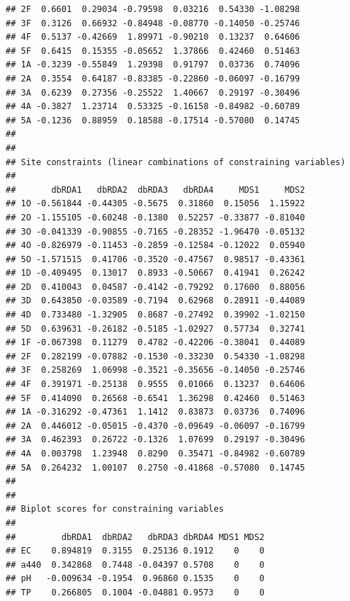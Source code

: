 \documentclass[
]{book}
\begin{document}
\begin{verbatim}
## 2F  0.6601  0.29034 -0.79598  0.03216  0.54330 -1.08298
## 3F  0.3126  0.66932 -0.84948 -0.08770 -0.14050 -0.25746
## 4F  0.5137 -0.42669  1.89971 -0.90210  0.13237  0.64606
## 5F  0.6415  0.15355 -0.05652  1.37866  0.42460  0.51463
## 1A -0.3239 -0.55849  1.29398  0.91797  0.03736  0.74096
## 2A  0.3554  0.64187 -0.83385 -0.22860 -0.06097 -0.16799
## 3A  0.6239  0.27356 -0.25522  1.40667  0.29197 -0.30496
## 4A -0.3827  1.23714  0.53325 -0.16158 -0.84982 -0.60789
## 5A -0.1236  0.88959  0.18588 -0.17514 -0.57080  0.14745
## 
## 
## Site constraints (linear combinations of constraining variables)
## 
##       dbRDA1   dbRDA2  dbRDA3   dbRDA4     MDS1     MDS2
## 1O -0.561844 -0.44305 -0.5675  0.31860  0.15056  1.15922
## 2O -1.155105 -0.60248 -0.1380  0.52257 -0.33877 -0.81040
## 3O -0.041339 -0.90855 -0.7165 -0.28352 -1.96470 -0.05132
## 4O -0.826979 -0.11453 -0.2859 -0.12584 -0.12022  0.05940
## 5O -1.571515  0.41706 -0.3520 -0.47567  0.98517 -0.43361
## 1D -0.409495  0.13017  0.8933 -0.50667  0.41941  0.26242
## 2D  0.410043  0.04587 -0.4142 -0.79292  0.17600  0.88056
## 3D  0.643850 -0.03589 -0.7194  0.62968  0.28911 -0.44089
## 4D  0.733480 -1.32905  0.8687 -0.27492  0.39902 -1.02150
## 5D  0.639631 -0.26182 -0.5185 -1.02927  0.57734  0.32741
## 1F -0.067398  0.11279  0.4782 -0.42206 -0.38041  0.44089
## 2F  0.282199 -0.07882 -0.1530 -0.33230  0.54330 -1.08298
## 3F  0.258269  1.06998 -0.3521 -0.35656 -0.14050 -0.25746
## 4F  0.391971 -0.25138  0.9555  0.01066  0.13237  0.64606
## 5F  0.414090  0.26568 -0.6541  1.36298  0.42460  0.51463
## 1A -0.316292 -0.47361  1.1412  0.83873  0.03736  0.74096
## 2A  0.446012 -0.05015 -0.4370 -0.09649 -0.06097 -0.16799
## 3A  0.462393  0.26722 -0.1326  1.07699  0.29197 -0.30496
## 4A  0.003798  1.23948  0.8290  0.35471 -0.84982 -0.60789
## 5A  0.264232  1.00107  0.2750 -0.41868 -0.57080  0.14745
## 
## 
## Biplot scores for constraining variables
## 
##         dbRDA1  dbRDA2   dbRDA3 dbRDA4 MDS1 MDS2
## EC    0.894819  0.3155  0.25136 0.1912    0    0
## a440  0.342868  0.7448 -0.04397 0.5708    0    0
## pH   -0.009634 -0.1954  0.96860 0.1535    0    0
## TP    0.266805  0.1004 -0.04881 0.9573    0    0
\end{verbatim}
\end{document}
